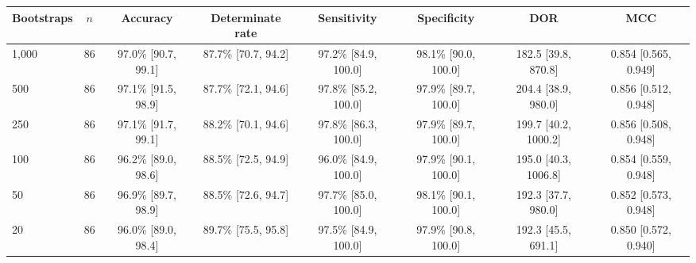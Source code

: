\begin{tabular}{lccccccc}
\toprule
Bootstraps & $n$ & Accuracy & Determinate rate & Sensitivity & Specificity & DOR & MCC \\
\midrule
1,000 & 86 & 97.0\% [90.7, 99.1] & 87.7\% [70.7, 94.2] & 97.2\% [84.9, 100.0] & 98.1\% [90.0, 100.0] & 182.5 [39.8, 870.8] & 0.854 [0.565, 0.949] \\
500 & 86 & 97.1\% [91.5, 98.9] & 87.7\% [72.1, 94.6] & 97.8\% [85.2, 100.0] & 97.9\% [89.7, 100.0] & 204.4 [38.9, 980.0] & 0.856 [0.512, 0.948] \\
250 & 86 & 97.1\% [91.7, 99.1] & 88.2\% [70.1, 94.6] & 97.8\% [86.3, 100.0] & 97.9\% [89.7, 100.0] & 199.7 [40.2, 1000.2] & 0.856 [0.508, 0.948] \\
100 & 86 & 96.2\% [89.0, 98.6] & 88.5\% [72.5, 94.9] & 96.0\% [84.9, 100.0] & 97.9\% [90.1, 100.0] & 195.0 [40.3, 1006.8] & 0.854 [0.559, 0.948] \\
50 & 86 & 96.9\% [89.7, 98.9] & 88.5\% [72.6, 94.7] & 97.7\% [85.0, 100.0] & 98.1\% [90.1, 100.0] & 192.3 [37.7, 980.0] & 0.852 [0.573, 0.948] \\
20 & 86 & 96.0\% [89.0, 98.4] & 89.7\% [75.5, 95.8] & 97.5\% [84.9, 100.0] & 97.9\% [90.8, 100.0] & 192.3 [45.5, 691.1] & 0.850 [0.572, 0.940] \\
\bottomrule
\end{tabular}
